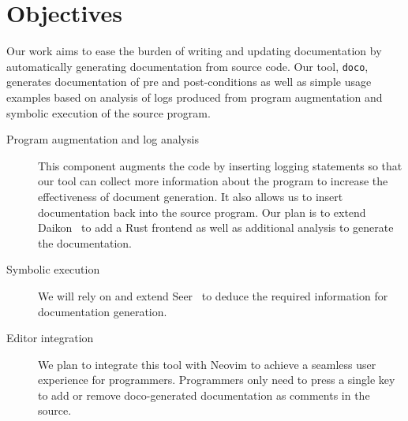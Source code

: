 \section{Objectives}

Our work aims to ease the burden of writing and updating documentation by automatically generating documentation from source code. Our tool, \texttt{doco}, generates documentation of pre and post-conditions as well as simple usage examples based on analysis of logs produced from program augmentation and symbolic execution of the source program.
\begin{description}
  \item [Program augmentation and log analysis] This component augments the code by inserting logging statements so that our tool can collect more information about the program to increase the effectiveness of document generation. It also allows us to insert documentation back into the source program. Our plan is to extend Daikon~\cite{Ernst:2007} to add a Rust frontend as well as additional analysis to generate the documentation.
  \item [Symbolic execution] We will rely on and extend Seer~\cite{Renshaw:2018} to deduce the required information for documentation generation.
  \item [Editor integration] We plan to integrate this tool with Neovim \cite{NeovimTeam:2018} to achieve a seamless user experience for programmers. Programmers only need to press a single key to add or remove doco-generated documentation as comments in the source.
\end{description}
